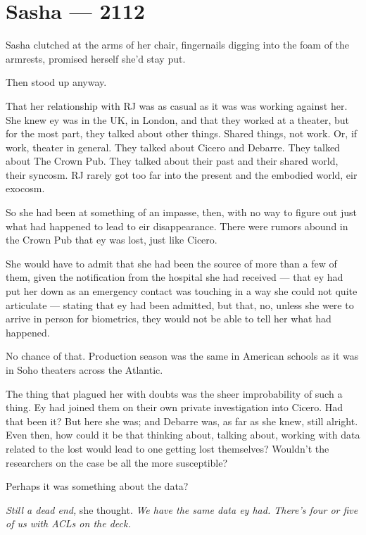 \hypertarget{sasha-2112}{%
\chapter*{Sasha — 2112}\label{sasha-2112}}

Sasha clutched at the arms of her chair, fingernails digging into the foam of the armrests, promised herself she'd stay put.

Then stood up anyway.

That her relationship with RJ was as casual as it was was working against her. She knew ey was in the UK, in London, and that they worked at a theater, but for the most part, they talked about other things. Shared things, not work. Or, if work, theater in general. They talked about Cicero and Debarre. They talked about The Crown Pub. They talked about their past and their shared world, their syncosm. RJ rarely got too far into the present and the embodied world, eir exocosm.

So she had been at something of an impasse, then, with no way to figure out just what had happened to lead to eir disappearance. There were rumors abound in the Crown Pub that ey was lost, just like Cicero.

She would have to admit that she had been the source of more than a few of them, given the notification from the hospital she had received — that ey had put her down as an emergency contact was touching in a way she could not quite articulate — stating that ey had been admitted, but that, no, unless she were to arrive in person for biometrics, they would not be able to tell her what had happened.

No chance of that. Production season was the same in American schools as it was in Soho theaters across the Atlantic.

The thing that plagued her with doubts was the sheer improbability of such a thing. Ey had joined them on their own private investigation into Cicero. Had that been it? But here she was; and Debarre was, as far as she knew, still alright. Even then, how could it be that thinking about, talking about, working with data related to the lost would lead to one getting lost themselves? Wouldn't the researchers on the case be all the more susceptible?

Perhaps it was something about the data?

\emph{Still a dead end,} she thought. \emph{We have the same data ey had. There's four or five of us with ACLs on the deck.}

